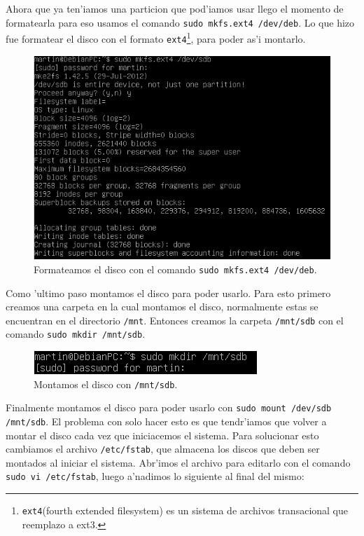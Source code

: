 \documentclass[11pt]{article}
\begin{document}
		Ahora que ya ten'iamos una particion que pod'iamos usar llego el momento de formatearla para eso usamos el comando \texttt{sudo mkfs.ext4 /dev/deb}. Lo que hizo fue formatear el disco con el formato \texttt{ext4}\footnote{\texttt{ext4}(fourth extended filesystem) es un sistema de archivos transacional que reemplazo a ext3.}, para poder as'i montarlo.
		
 		\begin{figure}[H]
    			\centering
    			\includegraphics[scale=0.65]{Images/rsync/rsync_disk_format.PNG}
    			\caption{Formateamos el disco con el comando \texttt{sudo mkfs.ext4 /dev/deb}.}
    			\label{fig:rsync_disk_format}
		\end{figure}

		Como 'ultimo paso montamos el disco para poder usarlo. Para esto primero creamos una carpeta en la cual montamos el disco, normalmente estas se encuentran en el directorio \texttt{/mnt}. Entonces creamos la carpeta \texttt{/mnt/sdb} con el comando \texttt{sudo mkdir /mnt/sdb}.

		\begin{figure}[H]
    			\centering
    			\includegraphics[scale=0.65]{Images/rsync/rsync_disk_mount.PNG}
    			\caption{Montamos el disco con \texttt{/mnt/sdb}.}
    			\label{fig:rsync_disk_mount}
		\end{figure}

		Finalmente montamos el disco para poder usarlo con \texttt{sudo mount /dev/sdb /mnt/sdb}. El problema con solo hacer esto es que tendr'iamos que volver a montar el disco cada vez que iniciacemos el sistema. Para solucionar esto cambiamos el archivo \texttt{/etc/fstab}, que almacena los discos que deben ser montados al iniciar el sistema. Abr'imos el archivo para editarlo con el comando \texttt{sudo vi /etc/fstab}, luego a'nadimos lo siguiente al final del mismo:
\end{document}
